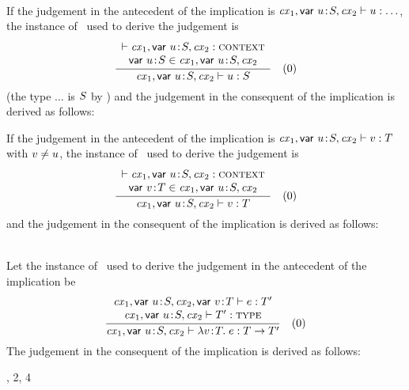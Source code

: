 \begin{bycase}
\Case{\Revar}\\
If the judgement in the antecedent of the implication is
$\mathit{cx}_1,\mathsf{var}\ u\!:\!S,\mathit{cx}_2\vdash u:\ldots$, the instance of \Revar\ used to derive the judgement
is
\[
\rruleII
 {\cxwf{\cxv}}
 {\vdec{\varI}{\typI}\in\cxv}
 {\hasty{\cxv}{\varI}{\typI}}
 {0}
\]
(the type $\ldots$ is $S$ by ) and the judgement
in the consequent of the implication is derived as follows:
\begin{derivation}
\end{derivation}

If the judgement in the antecedent of the implication is
$\mathit{cx}_1,\mathsf{var}\ u\!:\!S,\mathit{cx}_2\vdash v:T$ with $\var\neq\varI$, the instance of \Revar\ used
to derive the judgement is
\[
\rruleII
 {\cxwf{\cxv}}
 {\vdecO\in\cxv}
 {\hasty{\cxv}{\var}{\typ}}
 {0}
\]
and the judgement in the consequent of the implication is derived as follows:
\begin{derivation}
\step{\esbsren{\var}=\var}{\hyp\ $\var\neq\varI$}
\end{derivation}

\Case{\Reabs}\\
Let the instance of \Reabs\ used to derive the judgement in the antecedent of
the implication be
\[
\rruleII
 {\hasty{\snoc{\cxv}{\vdecO}}{\expr}{\typ'}}
 {\isty{\cxv}{\typ'}}
 {\hasty{\cxv}{\absO}{\tarr{\typ}{\typ'}}}
 {0}
\]
The judgement in the consequent of the implication is derived as follows:
\begin{derivation}
     {\Reabs, 2, 4}
\end{derivation}


\end{bycase}
